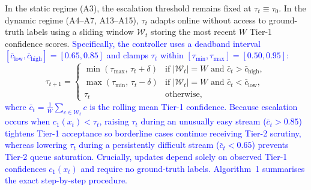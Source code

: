 \documentclass[diagnostics,article,submit,moreauthors]{Definitions/mdpi}
\newcommand{\rev}[1]{\textcolor{blue}{#1}}
\begin{document}
In the static regime (A3), the escalation threshold remains fixed at $\tau_t \equiv \tau_0$. In the dynamic regime (A4--A7, A13--A15), $\tau_t$ adapts online without access to ground-truth labels using a sliding window $\mathcal{W}_t$ storing the most recent $W$ Tier-1 confidence scores. \rev{Specifically, the controller uses a deadband interval $[\bar{c}_{\text{low}}, \bar{c}_{\text{high}}] = [0.65, 0.85]$ and clamps $\tau_t$ within $[\tau_{\min}, \tau_{\max}] = [0.50, 0.95]$:}
\begin{equation}
\tau_{t+1} =
\begin{cases}
\min(\tau_{\max},\, \tau_t + \delta) & \text{if } |\mathcal{W}_t| = W \text{ and } \bar{c}_t > \bar{c}_{\text{high}}, \\
\max(\tau_{\min},\, \tau_t - \delta) & \text{if } |\mathcal{W}_t| = W \text{ and } \bar{c}_t < \bar{c}_{\text{low}}, \\
\tau_t & \text{otherwise,}
\end{cases}
\label{eq:dynamic_routing}
\end{equation}
\rev{where $\bar{c}_t = \frac{1}{W}\sum_{c \in \mathcal{W}_t} c$ is the rolling mean Tier-1 confidence. Because escalation occurs when $c_1(x_t) < \tau_t$, raising $\tau_t$ during an unusually easy stream ($\bar{c}_t > 0.85$) tightens Tier-1 acceptance so borderline cases continue receiving Tier-2 scrutiny, whereas lowering $\tau_t$ during a persistently difficult stream ($\bar{c}_t < 0.65$) prevents Tier-2 queue saturation. Crucially, updates depend solely on observed Tier-1 confidences $c_1(x_t)$ and require no ground-truth labels. Algorithm~1 summarises the exact step-by-step procedure.}
\end{document}

